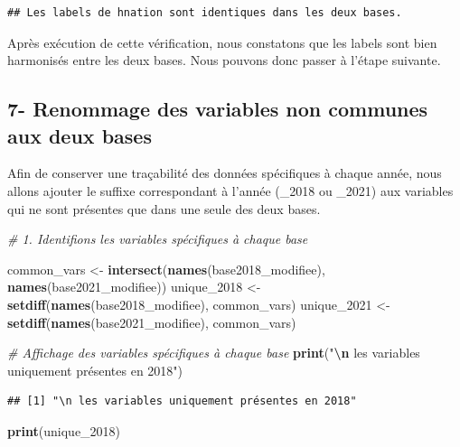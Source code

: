 \documentclass[
]{article}
\newenvironment{Shaded}{\begin{snugshade}}{\end{snugshade}}
\newcommand{\CommentTok}[1]{\textcolor[rgb]{0.56,0.35,0.01}{\textit{#1}}}
\newcommand{\FunctionTok}[1]{\textcolor[rgb]{0.13,0.29,0.53}{\textbf{#1}}}
\newcommand{\NormalTok}[1]{#1}
\newcommand{\OtherTok}[1]{\textcolor[rgb]{0.56,0.35,0.01}{#1}}
\newcommand{\SpecialCharTok}[1]{\textcolor[rgb]{0.81,0.36,0.00}{\textbf{#1}}}
\newcommand{\StringTok}[1]{\textcolor[rgb]{0.31,0.60,0.02}{#1}}
\begin{document}
\begin{verbatim}
## Les labels de hnation sont identiques dans les deux bases.
\end{verbatim}

Après exécution de cette vérification, nous constatons que les labels
sont bien harmonisés entre les deux bases. Nous pouvons donc passer à
l'étape suivante.

\hypertarget{renommage-des-variables-non-communes-aux-deux-bases}{%
\subsection{7- Renommage des variables non communes aux deux
bases}\label{renommage-des-variables-non-communes-aux-deux-bases}}

Afin de conserver une traçabilité des données spécifiques à chaque
année, nous allons ajouter le suffixe correspondant à l'année (\_2018 ou
\_2021) aux variables qui ne sont présentes que dans une seule des deux
bases.

\begin{Shaded}
\begin{Highlighting}[]
\CommentTok{\# 1. Identifions les variables spécifiques à chaque base}

\NormalTok{common\_vars }\OtherTok{\textless{}{-}} \FunctionTok{intersect}\NormalTok{(}\FunctionTok{names}\NormalTok{(base2018\_modifiee), }
                         \FunctionTok{names}\NormalTok{(base2021\_modifiee))}
\NormalTok{unique\_2018  }\OtherTok{\textless{}{-}} \FunctionTok{setdiff}\NormalTok{(}\FunctionTok{names}\NormalTok{(base2018\_modifiee), common\_vars)}
\NormalTok{unique\_2021  }\OtherTok{\textless{}{-}} \FunctionTok{setdiff}\NormalTok{(}\FunctionTok{names}\NormalTok{(base2021\_modifiee), common\_vars)}

\CommentTok{\# Affichage des variables spécifiques à chaque base}
\FunctionTok{print}\NormalTok{(}\StringTok{"}\SpecialCharTok{\textbackslash{}n}\StringTok{ les variables uniquement présentes en 2018"}\NormalTok{)}
\end{Highlighting}
\end{Shaded}

\begin{verbatim}
## [1] "\n les variables uniquement présentes en 2018"
\end{verbatim}

\begin{Shaded}
\begin{Highlighting}[]
\FunctionTok{print}\NormalTok{(unique\_2018)}
\end{Highlighting}
\end{Shaded}
\end{document}
